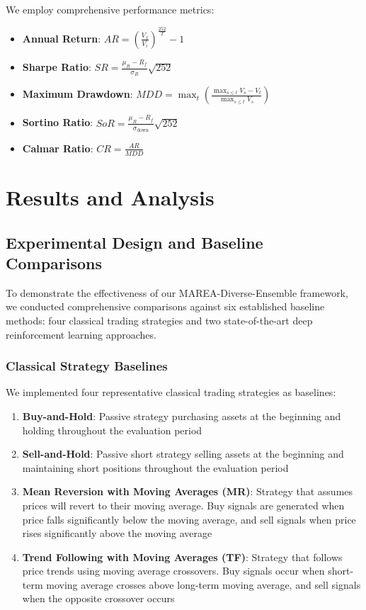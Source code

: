 \documentclass[10pt,twocolumn]{article}
\begin{document}
We employ comprehensive performance metrics:

\begin{itemize}[itemsep=1pt]
\item \textbf{Annual Return}: $AR = \left(\frac{V_f}{V_i}\right)^{\frac{252}{T}} - 1$
\item \textbf{Sharpe Ratio}: $SR = \frac{\mu_R - R_f}{\sigma_R} \sqrt{252}$
\item \textbf{Maximum Drawdown}: $MDD = \max_{t} \left(\frac{\max_{s \leq t} V_s - V_t}{\max_{s \leq t} V_s}\right)$
\item \textbf{Sortino Ratio}: $SoR = \frac{\mu_R - R_f}{\sigma_{\text{down}}} \sqrt{252}$
\item \textbf{Calmar Ratio}: $CR = \frac{AR}{MDD}$
\end{itemize}

\section{Results and Analysis}

\subsection{Experimental Design and Baseline Comparisons}

To demonstrate the effectiveness of our MAREA-Diverse-Ensemble framework, we conducted comprehensive comparisons against six established baseline methods: four classical trading strategies and two state-of-the-art deep reinforcement learning approaches.

\subsubsection{Classical Strategy Baselines}

We implemented four representative classical trading strategies as baselines:

\begin{enumerate}[itemsep=1pt]
\item \textbf{Buy-and-Hold}: Passive strategy purchasing assets at the beginning and holding throughout the evaluation period
\item \textbf{Sell-and-Hold}: Passive short strategy selling assets at the beginning and maintaining short positions throughout the evaluation period
\item \textbf{Mean Reversion with Moving Averages (MR)}: Strategy that assumes prices will revert to their moving average. Buy signals are generated when price falls significantly below the moving average, and sell signals when price rises significantly above the moving average
\item \textbf{Trend Following with Moving Averages (TF)}: Strategy that follows price trends using moving average crossovers. Buy signals occur when short-term moving average crosses above long-term moving average, and sell signals when the opposite crossover occurs
\end{enumerate}
\end{document}
